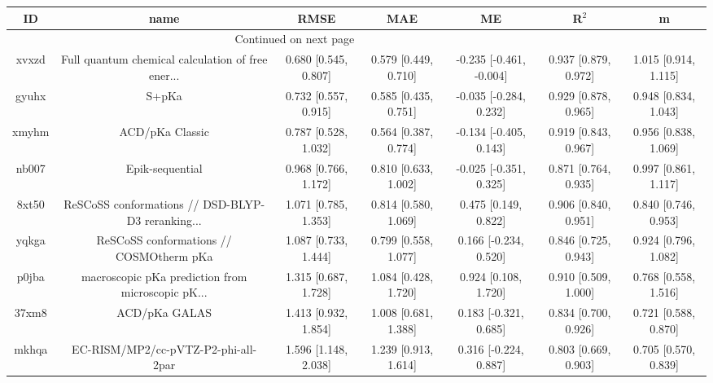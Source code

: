 \documentclass{article}
\begin{document}
\begin{center}
\begin{longtable}{|ccccccc|}
\toprule
    ID &                                               name &                  RMSE &                   MAE &                       ME &                 R$^2$ &                      m \\
\midrule
\endhead
\midrule
\multicolumn{3}{r}{{Continued on next page}} \\
\midrule
\endfoot

\bottomrule
\endlastfoot
 xvxzd &  Full quantum chemical calculation of free ener... &  0.680 [0.545, 0.807] &  0.579 [0.449, 0.710] &  -0.235 [-0.461, -0.004] &  0.937 [0.879, 0.972] &   1.015 [0.914, 1.115] \\
 gyuhx &                                              S+pKa &  0.732 [0.557, 0.915] &  0.585 [0.435, 0.751] &   -0.035 [-0.284, 0.232] &  0.929 [0.878, 0.965] &   0.948 [0.834, 1.043] \\
 xmyhm &                                    ACD/pKa Classic &  0.787 [0.528, 1.032] &  0.564 [0.387, 0.774] &   -0.134 [-0.405, 0.143] &  0.919 [0.843, 0.967] &   0.956 [0.838, 1.069] \\
 nb007 &                                    Epik-sequential &  0.968 [0.766, 1.172] &  0.810 [0.633, 1.002] &   -0.025 [-0.351, 0.325] &  0.871 [0.764, 0.935] &   0.997 [0.861, 1.117] \\
 8xt50 &  ReSCoSS conformations // DSD-BLYP-D3 reranking... &  1.071 [0.785, 1.353] &  0.814 [0.580, 1.069] &     0.475 [0.149, 0.822] &  0.906 [0.840, 0.951] &   0.840 [0.746, 0.953] \\
 yqkga &            ReSCoSS conformations // COSMOtherm pKa &  1.087 [0.733, 1.444] &  0.799 [0.558, 1.077] &    0.166 [-0.234, 0.520] &  0.846 [0.725, 0.943] &   0.924 [0.796, 1.082] \\
 p0jba &  macroscopic pKa prediction from microscopic pK... &  1.315 [0.687, 1.728] &  1.084 [0.428, 1.720] &     0.924 [0.108, 1.720] &  0.910 [0.509, 1.000] &   0.768 [0.558, 1.516] \\
 37xm8 &                                      ACD/pKa GALAS &  1.413 [0.932, 1.854] &  1.008 [0.681, 1.388] &    0.183 [-0.321, 0.685] &  0.834 [0.700, 0.926] &   0.721 [0.588, 0.870] \\
 mkhqa &                EC-RISM/MP2/cc-pVTZ-P2-phi-all-2par &  1.596 [1.148, 2.038] &  1.239 [0.913, 1.614] &    0.316 [-0.224, 0.887] &  0.803 [0.669, 0.903] &   0.705 [0.570, 0.839] \\

\end{longtable}
\end{center}
\end{document}

